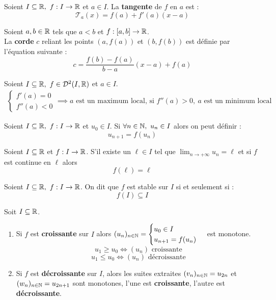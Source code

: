 \begin{definition}
	Soient $I \subseteq \mathbb{R},\ f : I \to \mathbb{R}$ et $a \in I$.
	La \textbf{tangente} de $f$ en $a$ est :
	\[ \mathcal{T}_a(x) = f(a) + f'(a)(x - a) \]
\end{definition}

\begin{definition}
	Soient $a, b \in \mathbb{R}$ tels que $a < b$ et $f : [a, b] \to \mathbb{R}$.
	\\
	La \textbf{corde} $c$ reliant les points $(a, f(a))$ et $(b, f(b))$ est définie par l'équation suivante :
	\[ c = \frac{f(b) - f(a)}{b - a} (x - a) + f(a) \]
\end{definition}

\begin{proposition}
	Soient $I \subseteq \mathbb{R},\ f \in \mathcal{D}^2(I, \mathbb{R})$ et $a \in I$.
	\begin{align*}
		\begin{cases}
			f'(a) = 0 \\
			f''(a) < 0
		\end{cases}
		\implies a \text{ est un maximum local, si } f''(a) > 0,\ a \text{  est un minimum local}
	\end{align*}
\end{proposition}

\begin{definition}
	Soient $I \subseteq \mathbb{R},\ f : I \to \mathbb{R}$ et $u_0 \in I$.
	Si $\forall n \in \mathbb{N},\ u_n \in I$ alors on peut définir :
	\[ u_{n + 1} = f(u_n) \]
\end{definition}

\begin{lemma}
	Soient $I \subseteq \mathbb{R}$ et $f : I \to \mathbb{R}$. S'il existe un $\ell \in I$ tel que $\lim_{n \to +\infty} u_n = \ell$ et si $f$ est continue en $\ell$ alors 
	\[ f(\ell) = \ell \]
\end{lemma}

\begin{definition}
	Soient $I \subseteq \mathbb{R},\ f : I \to \mathbb{R}$. On dit que $f$ est stable sur $I$ si et seulement si : 
	\[ f(I) \subseteq I \]
\end{definition}

\begin{proposition}
	Soit $I \subseteq \mathbb{R}$.
	\begin{enumerate}
		\item Si $f$ est \textbf{croissante} sur $I$ alors 
		$
		(u_n)_{n \in \mathbb{N}} = 
		\begin{cases}
			u_0 \in I \\
			u_{n + 1} = f(u_n)
		\end{cases}
		$
		est monotone.
		\[ u_1 \geq u_0 \iff (u_n) \text{ croissante} \]
		\[ u_1 \leq u_0 \iff (u_n) \text{ décroissante} \]
		\item Si $f$ est \textbf{décroissante} sur $I$, alors les suites extraites $(v_n)_{n \in \mathbb{N}} = u_{2n}$ et $(w_n)_{n \in \mathbb{N}} = u_{2n + 1}$ sont monotones, l'une est \textbf{croissante}, l'autre est \textbf{décroissante}.
	\end{enumerate}
\end{proposition}

